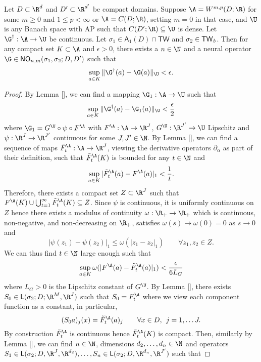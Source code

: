 \begin{theorem}
Let \(D \subset \R^d\) and \(D' \subset \R^{d'}\) be compact domains. Suppose \(\A = W^{m,p}(D;\R)\) for some \(m \geq 0\) and \(1 \leq p < \infty\) or \(\A = C(D;\R)\), setting \(m=0\) in that case, and \(\U\) is any Banach space with AP such that \(C(D';\R) \subseteq \U\) is dense. Let \(\G^\dagger : \A \to \U\) be continuous.
Let \(\sigma_1 \in \mathsf{A}_1(D) \cap \mathsf{TW}\) and \(\sigma_2 \in \mathsf{TW}_{\emph{\text{b}}}\). 
Then for any compact set \(K \subset \A\) and \(\epsilon > 0\), there exists a \(n \in \N\) and a neural operator \(\G \in \mathsf{NO}_{n,m}(\sigma_1,\sigma_2;D,D')\) such that
\[\sup_{a \in K} \|\G^\dagger (a) - \G (a) \|_{\U} < \epsilon.\]
\end{theorem}

\begin{proof}
By Lemma [], we can find a mapping \(\G_1 : \A \to \U\) 
such that
\[\sup_{a \in K} \|\G^\dagger (a) - \G_1(a)\|_{\U} < \frac{\epsilon}{2}\]
where \(\G_1 = G^\U \circ \psi \circ F^\A\) with \(F^\A : \A \to \R^J\), \(G^\U : \R^{J'} \to \U\) Lipschitz  and \(\psi : \R^{J} \to \R^{J'}\) continuous for some \(J, J' \in \N\).
By Lemma [], we can find a sequence of maps \(\tilde{F}^\A_t : \A \to \R^J\), viewing the derivative operators \(\partial_\alpha\) as part of their definition, such that 
\(\tilde{F}^\A_t (K)\) is bounded for any \(t \in \N\) and 
\[\sup_{a \in K} |\tilde{F}^\A_t (a) - F^\A (a)|_1 < \frac{1}{t}.\]
Therefore, there exists a compact set \(Z \subset \R^J\) such that 
\(F^\A (K) \cup \bigcup_{t=1}^\infty \tilde{F}^\A_t (K) \subseteq Z\). Since \(\psi\) is continuous, it is uniformly continuous on \(Z\) hence there exists a modulus of continuity \(\omega : \R_+ \to \R_+\) which is continuous, non-negative, and non-decreasing on \(\R_+\), satisfies \(\omega(s) \to \omega(0) = 0\) as \(s \to 0\) and
\[|\psi(z_1) - \psi(z_2)|_1 \leq \omega ( |z_1 - z_2|_1 ) \qquad \forall z_1, z_2 \in Z.\]
We can thus find \(t \in \N\) large enough such that
\[\sup_{a \in K} \omega (|F^\A (a) - \tilde{F}^\A_t (a)|_1) < \frac{\epsilon}{6 L_G}\]
where \(L_G > 0\) is the Lipschitz constant of \(G^\U\).
By Lemma [], there exists \(S_0 \in \mathsf{L}(\sigma_2;D;\R^{M}, \R^{J})\) such that \(S_0 = F^\A_t\) where we view each component function as a constant, in particular, 
\[(S_0 a)_j (x) = \tilde{F}^\A_t(a)_j \qquad \forall x \in D, \:\: j=1,\dots J.\]
By construction \(\tilde{F}^\A_t\) is continuous hence \(\tilde{F}^\A_t (K)\) is compact. Then,  similarly by Lemma [], we can find \(n \in \N\), dimensions \(d_2,\dots,d_n \in \N\) and operators \(S_1 \in \mathsf{L}(\sigma_2;D,\R^J,\R^{d_2}), \dots, S_n \in \mathsf{L}(\sigma_2;D,\R^{d_n},\R^{J'})\) such that

\end{proof}
